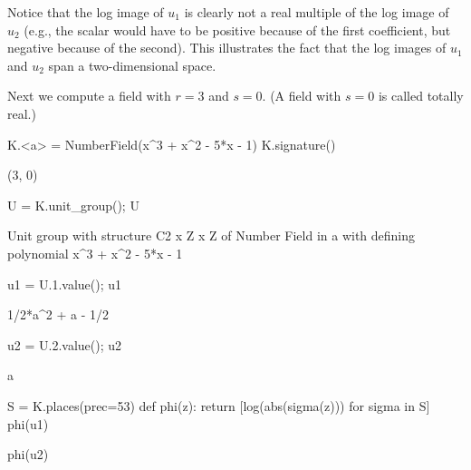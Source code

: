 Notice that the log image of $u_1$ is clearly not a real multiple of
the log image of $u_2$ (e.g., the scalar would have to be positive
because of the first coefficient, but negative because of the second).
This illustrates the fact that the log images of $u_1$ and $u_2$ span
a two-dimensional space.

Next we compute a field with $r=3$ and $s=0$.  (A field with $s=0$
is called totally real.)
\begin{sagecode}
\begin{sagecell}
K.<a> = NumberField(x^3 + x^2 - 5*x - 1)
K.signature()
\end{sagecell}
\begin{sageout}
(3, 0)
\end{sageout}
\begin{sagecell}
U = K.unit_group(); U
\end{sagecell}
\begin{sageout}
Unit group with structure C2 x Z x Z of Number Field in a with
defining polynomial x^3 + x^2 - 5*x - 1
\end{sageout}
\begin{sagecell}
u1 = U.1.value(); u1
\end{sagecell}
\begin{sageout}
1/2*a^2 + a - 1/2
\end{sageout}
\begin{sagecell}
u2 = U.2.value(); u2
\end{sagecell}
\begin{sageout}
a
\end{sageout}
\begin{sagecell}
S = K.places(prec=53)
def phi(z):
    return [log(abs(sigma(z))) for sigma in S]
phi(u1)
\end{sagecell}
\begin{sageout}
[-0.7747670223461895, -0.3928487245813982, 1.1676157469275887]
\end{sageout}
\begin{sagecell}
phi(u2)
\end{sagecell}
\begin{sageout}
[0.9966812040934553, -1.6402241503223172, 0.6435429462288627]
\end{sageout}
\end{sagecode}


